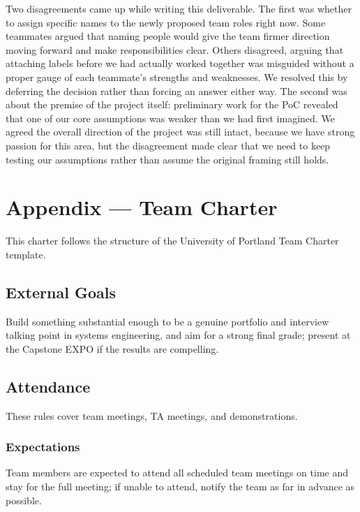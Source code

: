 \documentclass{article}
\begin{document}
\begin{enumerate}
    Two disagreements came up while writing this deliverable. The
    first was whether to assign specific names to the newly proposed team
    roles right now. Some teammates argued that naming people would give
    the team firmer direction moving forward and make responsibilities
    clear. Others disagreed, arguing that attaching labels before we had
    actually worked together was misguided without a proper gauge of each
    teammate's strengths and weaknesses. We resolved this by deferring the
    decision rather than forcing an answer either way. The second was
    about the premise of the project itself: preliminary work for the PoC
    revealed that one of our core assumptions was weaker than we had first
    imagined. We agreed the overall direction of the project was still
    intact, because we have strong passion for this area, but the
    disagreement made clear that we need to keep testing our assumptions
    rather than assume the original framing still holds.
\end{enumerate}

\newpage{}

\section*{Appendix --- Team Charter}

This charter follows the structure of the University of Portland Team
Charter template.

\subsection*{External Goals}

Build something substantial enough to be a genuine portfolio and interview
talking point in systems engineering, and aim for a strong final grade;
present at the Capstone EXPO if the results are compelling.

\subsection*{Attendance}

These rules cover team meetings, TA meetings, and demonstrations.

\subsubsection*{Expectations}

Team members are expected to attend all scheduled team meetings on time and
stay for the full meeting; if unable to attend, notify the team as far in
advance as possible.
\end{document}
